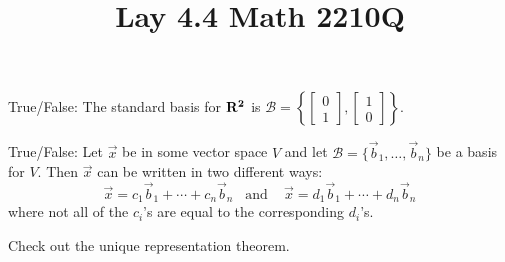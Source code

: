 \documentclass{ximera}
\newcommand{\RR}{\bf R}
\begin{document}
  	\title{Lay 4.4  \hfill Math 2210Q} 
  	  		    \begin{question} True/False:  The standard basis for $\RR^2$ is $\mathcal{B} = \left\{\begin{bmatrix}0\\1\end{bmatrix},\begin{bmatrix}1\\0\end{bmatrix}\right\}$.
  	  		    	
  	  		    	\begin{multipleChoice}
  	  		    	\end{multipleChoice}
  	  		    	
  	  		    \end{question}	
  	  		    \begin{question} True/False:  Let $\vec{x}$ be in some vector space $V$ and let $\mathcal{B} = \{\vec{b}_1, \dots,\vec{b}_n\}$ be a basis for $V$. Then $\vec{x}$ can be written in two different ways:
  	  		    	$$\vec{x}= c_1\vec{b}_1+\cdots+c_n\vec{b}_n \hspace{10pt} \text{and }\hspace{10pt} \vec{x}= d_1\vec{b}_1+\cdots+d_n\vec{b}_n $$
  	  		    	where not all of the $c_i$'s are equal to the corresponding $d_i$'s.\\
  	  		    	
  	  		    	\begin{multipleChoice}
  	  		    		\choice{True}
  	  		    		\choice[correct]{False}
  	  		    	\end{multipleChoice}
  	  		    	
  	  		    	\begin{hint}
  	  		    		Check out the unique representation theorem.
  	  		    		\end{hint}
  	  		    	
  	  		    \end{question}	
  	  		    
\end{document}
